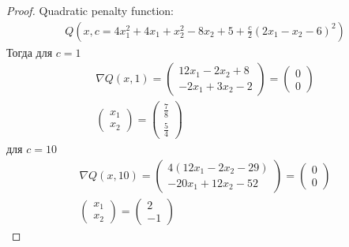 \begin{proof}
    Quadratic penalty function:
    \begin{gather*}
        Q(x, c = 4x_1^2 + 4x_1 + x_2^2 - 8x_2 + 5 + \frac{c}{2}(2x_1 - x_2 - 6)^2)
    \end{gather*}
    Тогда для $c = 1$
    \begin{gather*}
        \nabla Q(x, 1) =
        \begin{pmatrix}
            12x_1 - 2x_2 + 8\\
            -2x_1 + 3x_2 - 2
        \end{pmatrix}
        =
        \begin{pmatrix}
            0\\ 0
        \end{pmatrix}\\
        \begin{pmatrix}
            x_1\\ x_2
        \end{pmatrix}
        =
        \begin{pmatrix}
            \frac{7}{8}\\
            \frac{5}{4}
        \end{pmatrix}
    \end{gather*}
    для $c = 10$
    \begin{gather*}
        \nabla Q(x, 10) =
        \begin{pmatrix}
            4(12x_1 - 2x_2 - 29)\\
            -20x_1 + 12x_2 - 52
        \end{pmatrix}
        =
        \begin{pmatrix}
            0\\ 0
        \end{pmatrix}\\
        \begin{pmatrix}
            x_1\\ x_2
        \end{pmatrix}
        =
        \begin{pmatrix}
            2\\
            -1
        \end{pmatrix}
    \end{gather*}


\end{proof}
